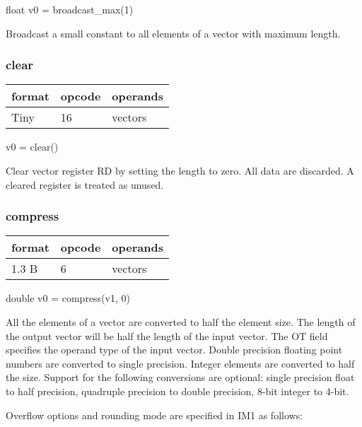 \documentclass[forwardcom.tex]{subfiles}
\begin{document}
float v0 = broadcast\_max(1)
\vspace{2mm}

Broadcast a small constant to all elements of a vector with maximum length.
\vspace{2mm}


\subsubsection{clear}
\label{table:clearInstruction}
\begin{tabular}{|p{12mm}|p{12mm}|p{110mm}|}
\hline
\bfseries format & \bfseries opcode & \bfseries operands \\ \hline
Tiny & 16 & vectors \\ \hline
\end{tabular}
\vspace{2mm}

v0 = clear()
\vspace{2mm}

Clear vector register RD by setting the length to zero. All data are discarded. A cleared register is treated as unused. 

\subsubsection{compress}
\label{table:compressInstruction}
\begin{tabular}{|p{12mm}|p{12mm}|p{110mm}|}
\hline
\bfseries format & \bfseries opcode & \bfseries operands \\ \hline
1.3 B & 6 & vectors \\ \hline
\end{tabular}
\vspace{2mm}

double v0 = compress(v1, 0)
\vspace{2mm}

All the elements of a vector are converted to half the element size. The length of the output vector will be half the length of the input vector. The OT field specifies the operand type of the input vector. Double precision floating point numbers are converted to single precision. Integer elements are converted to half the size. Support for the following conversions are optional: single precision float to half precision, quadruple precision to double precision, 8-bit integer to 4-bit.
\vspace{2mm}

Overflow options and rounding mode are specified in IM1 as follows:
\end{document}
